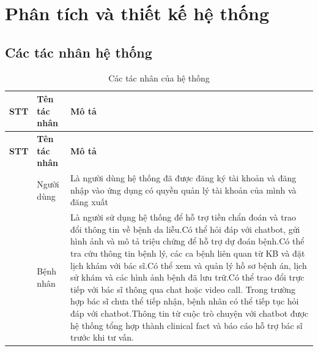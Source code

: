 \chapter[\MakeUppercase{Phân tích và thiết kế hệ thống}]{Phân tích và thiết kế hệ thống}
\label{ch:chuong2}

\section{Các tác nhân hệ thống}
\begin{longtable}{|>{\raggedright\arraybackslash}p{0.095\dimexpr\linewidth-6\tabcolsep\relax}|>{\raggedright\arraybackslash}p{0.179\dimexpr\linewidth-6\tabcolsep\relax}|>{\raggedright\arraybackslash}p{0.726\dimexpr\linewidth-6\tabcolsep\relax}|}
\caption{Các tác nhân của hệ thống}\label{tab:tac-nhan}\\
\hline
\textbf{STT} & \textbf{Tên tác nhân} & \textbf{Mô tả} \\ \hline
\endfirsthead
\hline
\textbf{STT} & \textbf{Tên tác nhân} & \textbf{Mô tả} \\ \hline
\endhead
1 & Người dùng & Là người dùng hệ thống đã được đăng ký tài khoản và đăng nhập vào ứng dụng có quyền quản lý tài khoản của mình và đăng xuất \\ \hline
2 & Bệnh nhân & Là người sử dụng hệ thống để hỗ trợ tiền chẩn đoán và trao đổi thông tin về bệnh da liễu.\newline Có thể hỏi đáp với chatbot, gửi hình ảnh và mô tả triệu chứng để hỗ trợ dự đoán bệnh.\newline Có thể tra cứu thông tin bệnh lý, các ca bệnh liên quan từ KB và đặt lịch khám với bác sĩ.\newline Có thể xem và quản lý hồ sơ bệnh án, lịch sử khám và các hình ảnh bệnh đã lưu trữ.\newline Có thể trao đổi trực tiếp với bác sĩ thông qua chat hoặc video call. Trong trường hợp bác sĩ chưa thể tiếp nhận, bệnh nhân có thể tiếp tục hỏi đáp với chatbot.\newline Thông tin từ cuộc trò chuyện với chatbot được hệ thống tổng hợp thành clinical fact và báo cáo hỗ trợ bác sĩ trước khi tư vấn. \\ \hline

\end{longtable}

